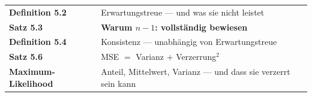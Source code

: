 \begin{merksatz}
\begin{center}
\renewcommand{\arraystretch}{1.5}
\begin{tabular}{@{}P{3.0cm}P{5.6cm}@{}}
\toprule
\textbf{Definition 5.2} & Erwartungstreue --- und was sie nicht leistet\\
\textbf{Satz 5.3} & \textbf{Warum $n-1$: vollständig bewiesen}\\
\textbf{Definition 5.4} & Konsistenz --- unabhängig von Erwartungstreue\\
\textbf{Satz 5.6} & MSE $=$ Varianz $+$ Verzerrung$^2$\\
\textbf{Maximum-Likelihood} & Anteil, Mittelwert, Varianz --- und dass sie verzerrt sein kann\\
\bottomrule
\end{tabular}
\end{center}

\begin{center}
\begin{minipage}{0.88\textwidth}
\end{minipage}
\end{center}
\end{merksatz}
